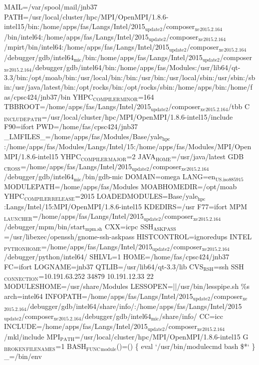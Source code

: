 \documentclass[11pt]{article}
\begin{document}
MAIL=/var/spool/mail/jnb37
PATH=/usr/local/cluster/hpc/MPI/OpenMPI/1.8.6-intel15/bin:/home/apps/fas/Langs/Intel/2015\(_{\text{update2}}\)/composer\(_{\text{xe}}\)\(_{\text{2015.2.164}}\)/bin/intel64:/home/apps/fas/Langs/Intel/2015\(_{\text{update2}}\)/composer\(_{\text{xe}}\)\(_{\text{2015.2.164}}\)/mpirt/bin/intel64:/home/apps/fas/Langs/Intel/2015\(_{\text{update2}}\)/composer\(_{\text{xe}}\)\(_{\text{2015.2.164}}\)/debugger/gdb/intel64\(_{\text{mic}}\)/bin:/home/apps/fas/Langs/Intel/2015\(_{\text{update2}}\)/composer\(_{\text{xe}}\)\(_{\text{2015.2.164}}\)/debugger/gdb/intel64/bin:/home/apps/fas/Modules:/usr/lib64/qt-3.3/bin:/opt/moab/bin:/usr/local/bin:/bin:/usr/bin:/usr/local/sbin:/usr/sbin:/sbin:/usr/java/latest/bin:/opt/rocks/bin:/opt/rocks/sbin:/home/apps/bin:/home/fas/cpsc424/jnb37/bin
YHPC\(_{\text{COMPILER}}\)\(_{\text{MINOR}}\)=164
TBBROOT=/home/apps/fas/Langs/Intel/2015\(_{\text{update2}}\)/composer\(_{\text{xe}}\)\(_{\text{2015.2.164}}\)/tbb
C\(_{\text{INCLUDE}}\)\(_{\text{PATH}}\)=/usr/local/cluster/hpc/MPI/OpenMPI/1.8.6-intel15/include
F90=ifort
PWD=/home/fas/cpsc424/jnb37
\_LMFILES\_=/home/apps/fas/Modules/Base/yale\(_{\text{hpc}}\):/home/apps/fas/Modules/Langs/Intel/15:/home/apps/fas/Modules/MPI/OpenMPI/1.8.6-intel15
YHPC\(_{\text{COMPILER}}\)\(_{\text{MAJOR}}\)=2
JAVA\(_{\text{HOME}}\)=/usr/java/latest
GDB\(_{\text{CROSS}}\)=/home/apps/fas/Langs/Intel/2015\(_{\text{update2}}\)/composer\(_{\text{xe}}\)\(_{\text{2015.2.164}}\)/debugger/gdb/intel64\(_{\text{mic}}\)/bin/gdb-mic
DOMAIN=omega
LANG=en\(_{\text{US.iso885915}}\)
MODULEPATH=/home/apps/fas/Modules
MOABHOMEDIR=/opt/moab
YHPC\(_{\text{COMPILER}}\)\(_{\text{RELEASE}}\)=2015
LOADEDMODULES=Base/yale\(_{\text{hpc}}\):Langs/Intel/15:MPI/OpenMPI/1.8.6-intel15
KDEDIRS=/usr
F77=ifort
MPM\(_{\text{LAUNCHER}}\)=/home/apps/fas/Langs/Intel/2015\(_{\text{update2}}\)/composer\(_{\text{xe}}\)\(_{\text{2015.2.164}}\)/debugger/mpm/bin/start\(_{\text{mpm.sh}}\)
CXX=icpc
SSH\(_{\text{ASKPASS}}\)=/usr/libexec/openssh/gnome-ssh-askpass
HISTCONTROL=ignoredups
INTEL\(_{\text{PYTHONHOME}}\)=/home/apps/fas/Langs/Intel/2015\(_{\text{update2}}\)/composer\(_{\text{xe}}\)\(_{\text{2015.2.164}}\)/debugger/python/intel64/
SHLVL=1
HOME=/home/fas/cpsc424/jnb37
FC=ifort
LOGNAME=jnb37
QTLIB=/usr/lib64/qt-3.3/lib
CVS\(_{\text{RSH}}\)=ssh
SSH\(_{\text{CONNECTION}}\)=10.191.63.252 34879 10.191.12.33 22
MODULESHOME=/usr/share/Modules
LESSOPEN=||/usr/bin/lesspipe.sh \%s
arch=intel64
INFOPATH=/home/apps/fas/Langs/Intel/2015\(_{\text{update2}}\)/composer\(_{\text{xe}}\)\(_{\text{2015.2.164}}\)/debugger/gdb/intel64/share/info/:/home/apps/fas/Langs/Intel/2015\(_{\text{update2}}\)/composer\(_{\text{xe}}\)\(_{\text{2015.2.164}}\)/debugger/gdb/intel64\(_{\text{mic}}\)/share/info/
CC=icc
INCLUDE=/home/apps/fas/Langs/Intel/2015\(_{\text{update2}}\)/composer\(_{\text{xe}}\)\(_{\text{2015.2.164}}\)/mkl/include
MPI\(_{\text{PATH}}\)=/usr/local/cluster/hpc/MPI/OpenMPI/1.8.6-intel15
G\(_{\text{BROKEN}}\)\(_{\text{FILENAMES}}\)=1
BASH\(_{\text{FUNC}}\)\(_{\text{module}}\)()=() \{  eval `/usr/bin/modulecmd bash \$*`
\}
\_=/bin/env
\end{document}
